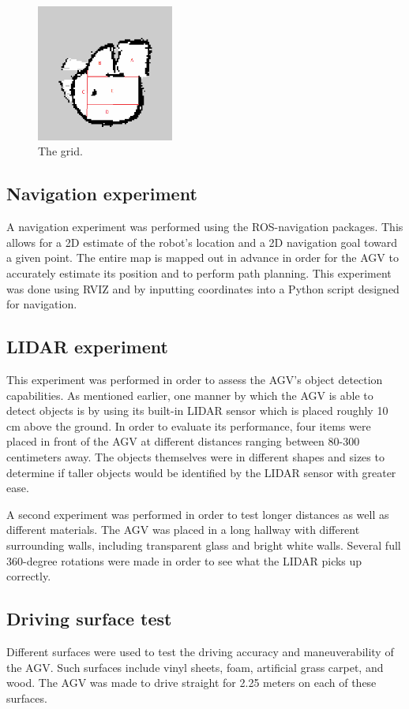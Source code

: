\begin{figure}[H]
    \centering
    \includegraphics[width=0.4\textwidth,height=0.45\textheight,keepaspectratio]{images/Map_grid.png}
    \caption{The grid.}
    \label{fig:app:grid}
\end{figure}

\subsection{Navigation experiment}
A navigation experiment was performed using the ROS-navigation packages. This allows for a 2D estimate of the robot's location and a 2D navigation goal toward a given point. The entire map is mapped out in advance in order for the AGV to accurately estimate its position and to perform path planning. This experiment was done using RVIZ and by inputting coordinates into a Python script designed for navigation.

\subsection{LIDAR experiment}
This experiment was performed in order to assess the AGV's object detection capabilities. As mentioned earlier, one manner by which the AGV is able to detect objects is by using its built-in LIDAR sensor which is placed roughly 10 cm above the ground. In order to evaluate its performance, four items were placed in front of the AGV at different distances ranging between 80-300 centimeters away. The objects themselves were in different shapes and sizes to determine if taller objects would be identified by the LIDAR sensor with greater ease. 

A second experiment was performed in order to test longer distances as well as different materials.
The AGV was placed in a long hallway with different surrounding walls, including transparent glass and bright white walls. Several full 360-degree rotations were made in order to see what the LIDAR picks up correctly.

\subsection{Driving surface test}
Different surfaces were used to test the driving accuracy and maneuverability of the AGV. Such surfaces include vinyl sheets, foam, artificial grass carpet, and wood. The AGV was made to drive straight for 2.25 meters on each of these surfaces.

